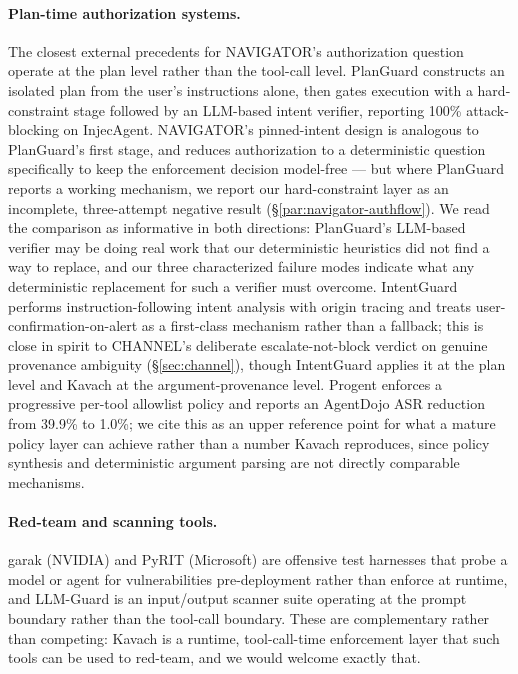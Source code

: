 \documentclass[sigconf,anonymous,review]{acmart}
\begin{document}
\paragraph{Plan-time authorization systems.} The closest external precedents
for NAVIGATOR's authorization question operate at the plan level rather than
the tool-call level. PlanGuard \cite{gong2026planguard} constructs an isolated
plan from the user's instructions alone, then gates execution with a
hard-constraint stage followed by an LLM-based intent verifier, reporting
100\% attack-blocking on InjecAgent. NAVIGATOR's pinned-intent design is
analogous to PlanGuard's first stage, and reduces authorization to a
deterministic question specifically to keep the enforcement decision
model-free --- but where PlanGuard reports a working mechanism, we report our
hard-constraint layer as an incomplete, three-attempt negative result
(\S\ref{par:navigator-authflow}). We read the comparison as informative in
both directions: PlanGuard's LLM-based verifier may be doing real work that
our deterministic heuristics did not find a way to replace, and our three
characterized failure modes indicate what any deterministic replacement for
such a verifier must overcome. IntentGuard \cite{kang2025intentguard}
performs instruction-following intent analysis with origin tracing and treats
user-confirmation-on-alert as a first-class mechanism rather than a fallback;
this is close in spirit to CHANNEL's deliberate escalate-not-block verdict on
genuine provenance ambiguity (\S\ref{sec:channel}), though IntentGuard
applies it at the plan level and Kavach at the argument-provenance level.
Progent \cite{shi2025progent} enforces a progressive per-tool allowlist
policy and reports an AgentDojo ASR reduction from 39.9\% to 1.0\%; we cite
this as an upper reference point for what a mature policy layer can achieve
rather than a number Kavach reproduces, since policy synthesis and
deterministic argument parsing are not directly comparable mechanisms.

\paragraph{Red-team and scanning tools.} garak \cite{garak2024} (NVIDIA) and
PyRIT \cite{pyrit2024} (Microsoft) are offensive test harnesses that probe a
model or agent for vulnerabilities pre-deployment rather than enforce at
runtime, and LLM-Guard \cite{llmguard2024} is an input/output scanner suite
operating at the prompt boundary rather than the tool-call boundary. These
are complementary rather than competing: Kavach is a runtime,
tool-call-time enforcement layer that such tools can be used to red-team,
and we would welcome exactly that.
\end{document}

